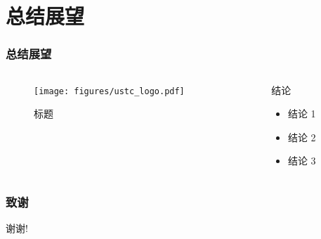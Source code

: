 \documentclass[aspectratio=169]{ctexbeamer}
\begin{document}
\section{总结展望}

\begin{frame}
  \frametitle{总结展望}
  \begin{columns}
    \begin{column}{0.50\textwidth}
      \begin{figure}
        \texttt{[image: figures/ustc\_logo.pdf]}
        \caption{标题}
      \end{figure}
    \end{column}
    \begin{column}{0.50\textwidth}
      \begin{block}{结论}
        \begin{itemize}
          \item 结论 1
          \item 结论 2
          \item 结论 3
        \end{itemize}
      \end{block}
    \end{column}
  \end{columns}
\end{frame}

\begin{frame}
  \frametitle{致谢}
  \centerline{\Large 谢谢!}
\end{frame}
\end{document}
